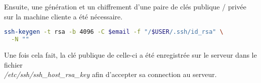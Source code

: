 Ensuite, une génération et un chiffrement d'une paire de clés publique / privée
sur la machine cliente a été nécessaire.

\begin{lstlisting}[language=bash]
  ssh-keygen -t rsa -b 4096 -C $email -f "/$USER/.ssh/id_rsa" \
  -N ""
\end{lstlisting}

Une fois cela fait, la clé publique de celle-ci a été enregistrée sur le serveur
dans le fichier \\
\textit{/etc/ssh/ssh\_host\_rsa\_key} afin d'accepter sa connection au serveur.


